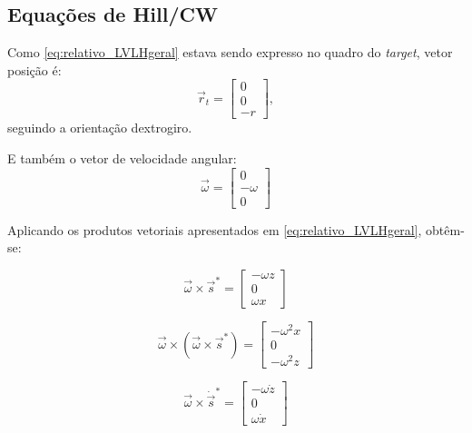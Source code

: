 \subsection{Equações de Hill/CW}

Como \eqref{eq:relativo_LVLHgeral} estava sendo expresso no quadro do \emph{target}, vetor posição é:
\begin{equation}
\label{eq:posicao_LVLH_target}
\vec r_t
=
\begin{bmatrix}
0 \\
0 \\
-r
\end{bmatrix},
\end{equation}
seguindo a orientação dextrogiro.

E também o vetor de velocidade angular:
\begin{equation}
\label{eq:velocidadeAngular_LVLH_target}
\vec\omega=
\begin{bmatrix}
0 \\
-\omega \\
0
\end{bmatrix}
\end{equation}

Aplicando os produtos vetoriais apresentados em \eqref{eq:relativo_LVLHgeral}, obtêm-se:

\begin{equation}
\label{eq:velAngular_cross_s}
\vec\omega \times \vec s^* =
\begin{bmatrix}
-\omega z \\
0         \\
\omega x
\end{bmatrix} 
\end{equation}

\begin{equation}
\label{eq:velAngular_cross_cross_s}
\vec\omega \times (\vec\omega \times \vec s^*)
=
\begin{bmatrix}
-\omega^2 x \\
0           \\
-\omega^2 z 
\end{bmatrix}
\end{equation}

\begin{equation}
\label{eq:omega_cross_dsdt}
\vec\omega \times \dot{\vec s}^{*}
=
\begin{bmatrix}
-\omega \dot z \\
0 \\
\omega \dot x
\end{bmatrix}
\end{equation}

